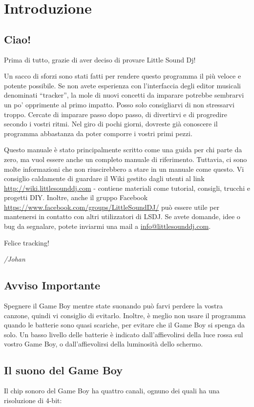 \chapter{Introduzione}
\section{Ciao!}
Prima di tutto, grazie di aver deciso di provare Little Sound Dj!

Un sacco di sforzi sono stati fatti per rendere questo programma il più veloce e potente possibile.
Se non avete esperienza con l’interfaccia degli editor musicali denominati “tracker”, la mole di nuovi concetti da imparare potrebbe sembrarvi un po’ opprimente al primo impatto. Posso solo consigliarvi di non stressarvi troppo. Cercate di imparare passo dopo passo, di divertirvi e di progredire secondo i vostri ritmi. 
Nel giro di pochi giorni, dovreste già conoscere il programma abbastanza da poter comporre i vostri primi pezzi. 

Questo manuale è stato principalmente scritto come una guida per chi parte da zero, ma vuol essere anche un completo manuale di riferimento. Tuttavia, ci sono molte informazioni che non riuscirebbero a stare in un manuale come questo. Vi consiglio caldamente di guardare il Wiki gestito dagli utenti al link \url{http://wiki.littlesounddj.com} - contiene materiali come tutorial, consigli, trucchi e progetti DIY. Inoltre, anche il gruppo Facebook \url{https://www.facebook.com/groups/LittleSoundDJ/} può essere utile per mantenersi in contatto con altri utilizzatori di LSDJ.
Se avete domande, idee o bug da segnalare, potete inviarmi una mail a \href{mailto:info@littlesounddj.com}{info@littlesounddj.com}.

Felice tracking!

\textit{/Johan}

\section{Avviso Importante}

Spegnere il Game Boy mentre state suonando può farvi perdere la vostra canzone, quindi vi consiglio di evitarlo.
Inoltre, è meglio non usare il programma quando le batterie sono quasi scariche, per evitare che il Game Boy si spenga da solo.
Un basso livello delle batterie è indicato dall'affievolirsi della luce rossa sul vostro Game Boy, o dall'affievolirsi della luminosità dello schermo.

\section{Il suono del Game Boy}
Il chip sonoro del Game Boy ha quattro canali, ognuno dei quali ha una risoluzione di 4-bit:


